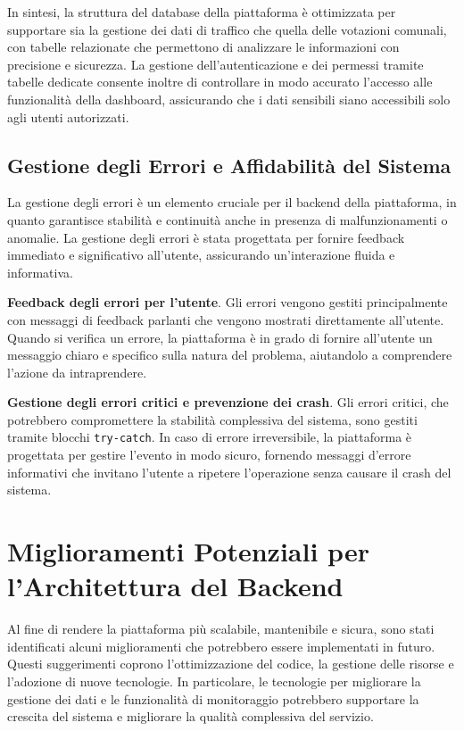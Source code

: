 In sintesi, la struttura del database della piattaforma è ottimizzata per supportare sia la gestione dei dati di traffico che quella delle votazioni comunali, con tabelle relazionate che permettono di analizzare le informazioni con precisione e sicurezza. La gestione dell’autenticazione e dei permessi tramite tabelle dedicate consente inoltre di controllare in modo accurato l’accesso alle funzionalità della dashboard, assicurando che i dati sensibili siano accessibili solo agli utenti autorizzati.

\subsection{Gestione degli Errori e Affidabilità del Sistema}

La gestione degli errori è un elemento cruciale per il backend della piattaforma, in quanto garantisce stabilità e continuità anche in presenza di malfunzionamenti o anomalie. La gestione degli errori è stata progettata per fornire feedback immediato e significativo all'utente, assicurando un'interazione fluida e informativa.

\textbf{Feedback degli errori per l’utente}. Gli errori vengono gestiti principalmente con messaggi di feedback parlanti che vengono mostrati direttamente all’utente. Quando si verifica un errore, la piattaforma è in grado di fornire all’utente un messaggio chiaro e specifico sulla natura del problema, aiutandolo a comprendere l’azione da intraprendere.

\textbf{Gestione degli errori critici e prevenzione dei crash}. Gli errori critici, che potrebbero compromettere la stabilità complessiva del sistema, sono gestiti tramite blocchi \texttt{try-catch}. In caso di errore irreversibile, la piattaforma è progettata per gestire l’evento in modo sicuro, fornendo messaggi d’errore informativi che invitano l’utente a ripetere l'operazione senza causare il crash del sistema.

\section{Miglioramenti Potenziali per l’Architettura del Backend}

Al fine di rendere la piattaforma più scalabile, mantenibile e sicura, sono stati identificati alcuni miglioramenti che potrebbero essere implementati in futuro. Questi suggerimenti coprono l’ottimizzazione del codice, la gestione delle risorse e l’adozione di nuove tecnologie. In particolare, le tecnologie per migliorare la gestione dei dati e le funzionalità di monitoraggio potrebbero supportare la crescita del sistema e migliorare la qualità complessiva del servizio.


